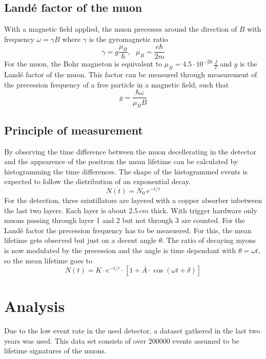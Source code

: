 \documentclass{include/thesisclass3}
\newcommand{\cc}{\cdot}
\newcommand{\e}[1]{\,\si{#1}}
\begin{document}
\section{Landé factor of the muon}
With a magnetic field applied, the muon precesses around the direction of $B$ with frequency $\omega = \gamma B$ where $\gamma$ is the gyromagnetic ratio
\[ \gamma = g \frac{\mu_B}{\hbar}, ~~~\mu_B = \frac{e\hbar}{2m}\]
For the muon, the Bohr magneton is equivalent to $\mu_B = 4.5\cc10^{-26}\e{\frac{J}{T}}$ and $g$ is the Landé factor of the muon.
This factor can be measured through measurement of the precession frequency of a free particle in a magnetic field, such that
\begin{equation} g = \frac{\hbar \omega}{\mu_B B}
\label{lande}
\end{equation}

\section{Principle of measurement}
By observing the time difference between the muon decellerating in the detector and the appearence of the positron the mean lifetime can be calculated by histogramming the time differences. The shape of the histogrammed events is expected to follow the distribution of an exponential decay.
\begin{equation}
N(t)=N_0\,e^{-t/\tau}
\end{equation}
For the detection, three szintillators are layered with a copper absorber inbetween the last two layers. Each layer is about $2.5\e{cm}$ thick. With trigger hardware only muons passing through layer 1 and 2 but not through 3 are counted. 
For the Landé factor the precession frequency has to be measuered. For this, the mean lifetime gets observed but just on a decent angle $\theta$. The ratio of decaying myons is now modulated by the precession and the angle is time dependant with $\theta = \omega t$, so the mean lifetime goes to 
\begin{equation}
N(t)=K\cdot e^{ -t/\tau } \cdot [ 1+\bar A \cdot \cos(\omega t + \delta )]\label{n(t)}
\end{equation}

\chapter{Analysis}
Due to the low event rate in the used detector, a dataset gathered in the last two years was used. 
This data set consists of over 200000 events assumed to be lifetime signatures of the muons.
\end{document}

